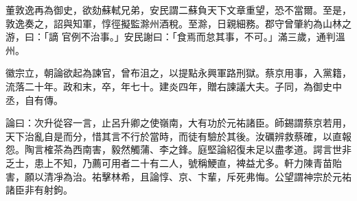\begin{pinyinscope}
 董敦逸再為御史，欲劾蘇軾兄弟，安民謂二蘇負天下文章重望，恐不當爾。至是，敦逸奏之，詔與知軍，惇徑擬監滁州酒稅。至滁，日親細務。郡守曾肇約為山林之游，曰：「謫
 官例不治事。」安民謝曰：「食焉而怠其事，不可。」滿三歲，通判溫州。



 徽宗立，朝論欲起為諫官，曾布沮之，以提點永興軍路刑獄。蔡京用事，入黨籍，流落二十年。政和末，卒，年七十。建炎四年，贈右諫議大夫。子同，為御史中丞，自有傳。



 論曰：次升從容一言，止呂升卿之使嶺南，大有功於元祐諸臣。師錫謂蔡京若用，天下治亂自是而分，惜其言不行於當時，而徒有驗於其後。汝礪辨救蔡確，以直報
 怨。陶言榷茶為西南害，毅然觸蒲、李之鋒。庭堅論紹復未足以盡孝道。諤言世非乏士，患上不知，乃薦可用者二十有二人，號稱鯁直，裨益尤多。軒力陳青苗貽害，願以清凈為治。祐擊林希，且論惇、京、卞輩，斥死弗悔。公望謂神宗於元祐諸臣非有射鉤。



\end{pinyinscope}